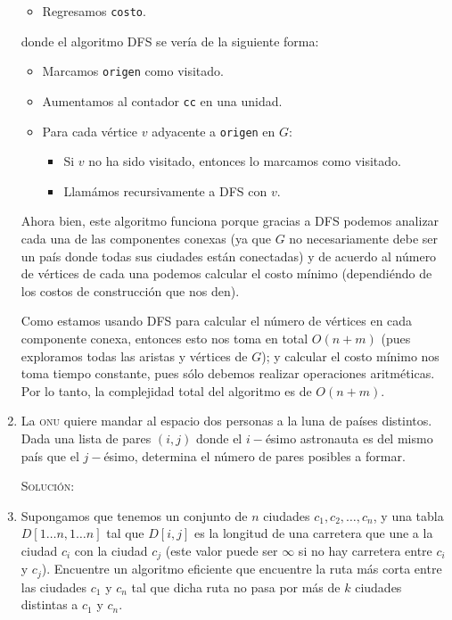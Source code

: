 \documentclass[letterpaper,11pt]{article}
\begin{document}
\begin{enumerate}
\begin{itemize}
        \item Regresamos \texttt{costo}.
    \end{itemize}

    donde el algoritmo DFS se vería de la siguiente forma:
    \begin{itemize}
        \item Marcamos \texttt{origen} como visitado.
        \item Aumentamos al contador \texttt{cc} en una unidad.
        \item Para cada vértice $v$ adyacente a \texttt{origen} en $G$:
        \begin{itemize}
            \item Si $v$ no ha sido visitado, entonces lo marcamos como 
            visitado.
            \item Llamámos recursivamente a DFS con $v$.
        \end{itemize}
    \end{itemize}

    Ahora bien, este algoritmo funciona porque gracias a DFS podemos analizar 
    cada una de las componentes conexas (ya que $G$ no necesariamente debe 
    ser un país donde todas sus ciudades están conectadas) y de acuerdo al 
    número de vértices de cada una podemos calcular el costo mínimo 
    (dependiéndo de los costos de construcción que nos den).

    Como estamos usando DFS para calcular el número de vértices en cada 
    componente conexa, entonces esto nos toma en total $O(n + m)$ (pues 
    exploramos todas las aristas y vértices de $G$); y calcular
    el costo mínimo nos toma tiempo constante, pues sólo debemos realizar 
    operaciones aritméticas. Por lo tanto, la complejidad total del algoritmo 
    es de $O(n + m)$.

    \item La \textsc{onu} quiere mandar al espacio dos personas a la luna de
    países distintos. Dada una lista de pares $(i, j)$ donde el $i-$ésimo 
    astronauta es del mismo país que el $j-$ésimo, determina el número de 
    pares posibles a formar. 

    \textsc{Solución:}

    \item Supongamos que tenemos un conjunto de $n$ ciudades $c_1, c_2, \ldots,
    c_n$, y una tabla $D[1 \ldots n, 1 \ldots n]$ tal que $D[i,j]$ es la longitud 
    de una carretera que une a la ciudad $c_i$ con la ciudad $c_j$ (este valor 
    puede ser $\infty$ si no hay carretera entre $c_i$ y $c_j$). Encuentre un 
    algoritmo eficiente que encuentre la ruta más corta entre las ciudades $c_1$
    y $c_n$ tal que dicha ruta no pasa por más de $k$ ciudades distintas a 
    $c_1$ y $c_n$.


\end{enumerate}
\end{document}
